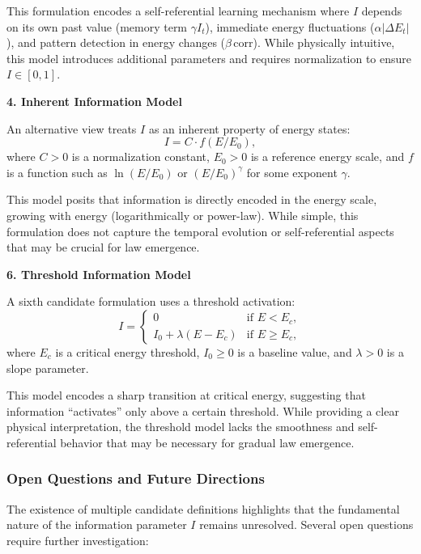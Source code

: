\documentclass[12pt,a4paper]{article}
\theoremstyle{definition}
\theoremstyle{remark}
\begin{document}
This formulation encodes a self-referential learning mechanism where $I$ depends on its own past value (memory term $\gamma I_t$), immediate energy fluctuations ($\alpha |\Delta E_t|$), and pattern detection in energy changes ($\beta \, \mathrm{corr}$). While physically intuitive, this model introduces additional parameters and requires normalization to ensure $I \in [0,1]$.

\textbf{4. Inherent Information Model}

An alternative view treats $I$ as an inherent property of energy states:
\begin{equation}\label{eq:I_inherent}
I = C \cdot f(E/E_0),
\end{equation}
where $C > 0$ is a normalization constant, $E_0 > 0$ is a reference energy scale, and $f$ is a function such as $\ln(E/E_0)$ or $(E/E_0)^\gamma$ for some exponent $\gamma$.

This model posits that information is directly encoded in the energy scale, growing with energy (logarithmically or power-law). While simple, this formulation does not capture the temporal evolution or self-referential aspects that may be crucial for law emergence.

\textbf{6. Threshold Information Model}

A sixth candidate formulation uses a threshold activation:
\begin{equation}\label{eq:I_threshold}
I = \begin{cases}
0 & \text{if } E < E_c, \\
I_0 + \lambda (E - E_c) & \text{if } E \geq E_c,
\end{cases}
\end{equation}
where $E_c$ is a critical energy threshold, $I_0 \geq 0$ is a baseline value, and $\lambda > 0$ is a slope parameter.

This model encodes a sharp transition at critical energy, suggesting that information ``activates'' only above a certain threshold. While providing a clear physical interpretation, the threshold model lacks the smoothness and self-referential behavior that may be necessary for gradual law emergence.

\subsubsection{Open Questions and Future Directions}

The existence of multiple candidate definitions highlights that the fundamental nature of the information parameter $I$ remains unresolved. Several open questions require further investigation:
\end{document}
